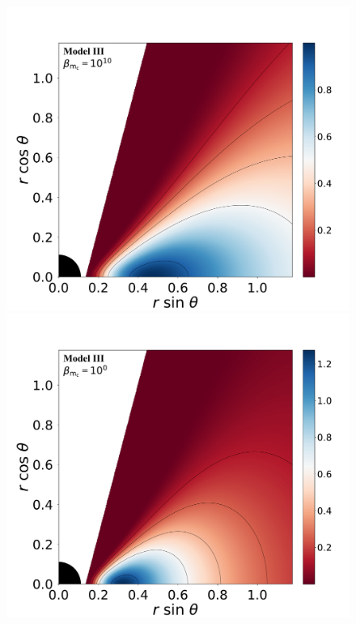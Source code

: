 \documentclass[twocolumn,aps,showpacs,showkeys,prd,superscriptaddress,byrevtex, amsmath]{revtex4-1}
\begin{document}
\begin{figure}
\includegraphics[scale=0.14]{figures/fig1_III_10.pdf}
\hspace{-0.3cm}
\includegraphics[scale=0.14]{figures/fig1_III_1.pdf}
\hspace{-0.2cm}

\end{figure}
\end{document}
